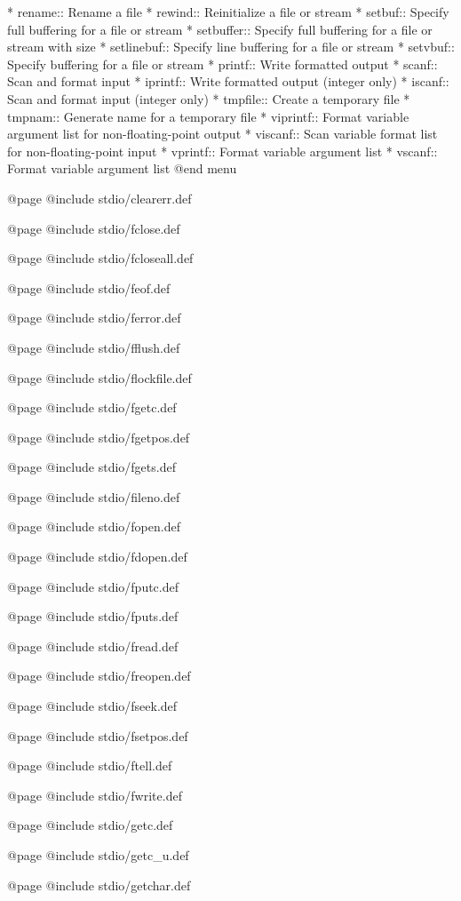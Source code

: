 * rename::      Rename a file
* rewind::      Reinitialize a file or stream
* setbuf::      Specify full buffering for a file or stream
* setbuffer::   Specify full buffering for a file or stream with size
* setlinebuf::  Specify line buffering for a file or stream
* setvbuf::     Specify buffering for a file or stream
* printf::      Write formatted output
* scanf::       Scan and format input
* iprintf::     Write formatted output (integer only)
* iscanf::      Scan and format input (integer only)
* tmpfile::     Create a temporary file
* tmpnam::      Generate name for a temporary file
* viprintf::    Format variable argument list for non-floating-point output
* viscanf::     Scan variable format list for non-floating-point input
* vprintf::     Format variable argument list
* vscanf::      Format variable argument list
@end menu 

@page
@include stdio/clearerr.def

@page
@include stdio/fclose.def

@page
@include stdio/fcloseall.def

@page
@include stdio/feof.def

@page
@include stdio/ferror.def

@page
@include stdio/fflush.def

@page
@include stdio/flockfile.def

@page 
@include stdio/fgetc.def

@page
@include stdio/fgetpos.def

@page 
@include stdio/fgets.def

@page
@include stdio/fileno.def

@page
@include stdio/fopen.def

@page
@include stdio/fdopen.def

@page
@include stdio/fputc.def

@page
@include stdio/fputs.def

@page
@include stdio/fread.def

@page
@include stdio/freopen.def

@page
@include stdio/fseek.def

@page
@include stdio/fsetpos.def

@page
@include stdio/ftell.def

@page
@include stdio/fwrite.def

@page 
@include stdio/getc.def

@page
@include stdio/getc_u.def

@page
@include stdio/getchar.def

